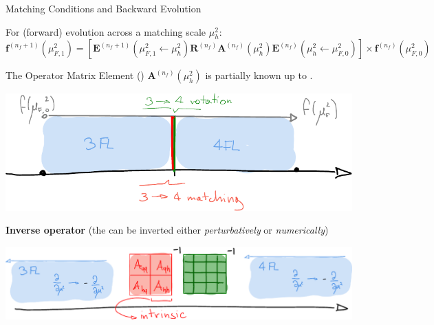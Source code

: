 \documentclass[9pt]{beamer}
\begin{document}
\begin{frame}{Matching Conditions and Backward Evolution}
    \vspace*{10pt}

	For (forward) evolution across a matching scale $\mu_h^2$:
	\begin{equation*} 
        \mathbf{f}^{(n_f+1)}(\mu_{F,1}^2) =
        \left[\mathbf{E}^{(n_f+1)}(\mu_{F,1}^2\leftarrow \mu_{h}^2)
		{\mathbf{R}^{(n_f)}}
		\mathbf{A}^{(n_f)}(\mu_{h}^2)
        \mathbf{E}^{(n_f)}(\mu_{h}^2\leftarrow \mu_{F,0}^2) \right]
		\times \mathbf{f}^{(n_f)}(\mu_{F,0}^2)
	\end{equation*}

    The Operator Matrix Element (\ome) $\mathbf{A}^{(n_f)}(\mu_{h}^2)$ is partially known up to \nnnlo.

	\begin{center}
        \includegraphics[scale=.7]{vfns-details}
	\end{center}

    \textbf{Inverse operator} (the \ome can be inverted either
    \textit{perturbatively} or \textit{numerically})
	\begin{center}
        \includegraphics[scale=.7]{vfns-back-details}
	\end{center}
\end{frame}
\end{document}
